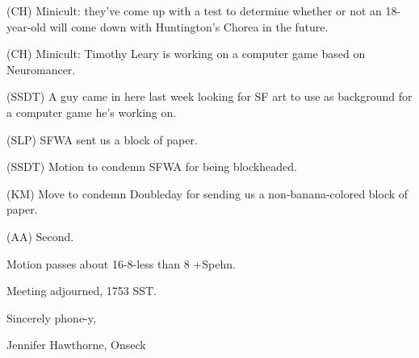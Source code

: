 \documentclass[12pt]{article}
\begin{document}
(CH) Minicult: they've come up with a test to determine whether or not an 18-year-old will come down with Huntington's Chorea in the future.

(CH) Minicult: Timothy Leary is working on a computer game based on Neuromancer.

(SSDT) A guy came in here last week looking for SF art to use as background for a computer game he's working on.

(SLP) SFWA sent us a block of paper.

(SSDT) Motion to condemn SFWA for being blockheaded.

(KM) Move to condemn Doubleday for sending us a non-banana-colored block of paper.

(AA) Second.

Motion passes about 16-8-less than 8 +Spehn.

\vspace{12pt}

\noindent
Meeting adjourned, 1753 SST.

\vspace{18pt}

\centerline{Sincerely phone-y,}
\centerline{Jennifer Hawthorne, Onseck}
\end{document}
